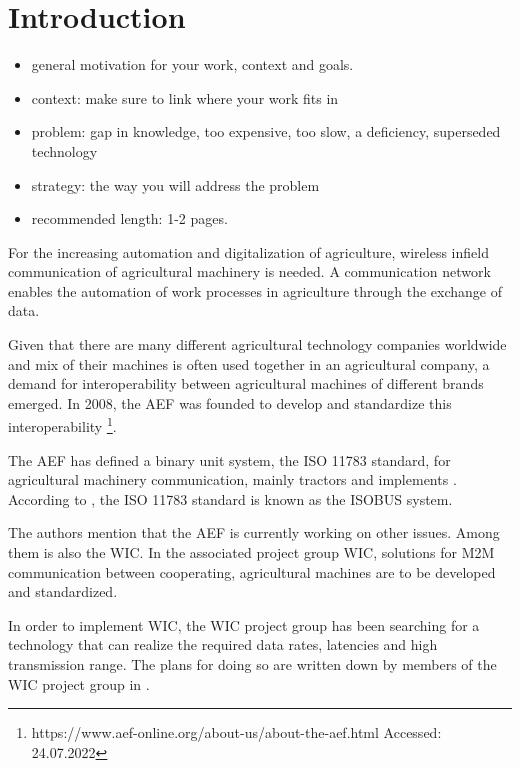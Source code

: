 \documentclass[]{nsm-thesis}
\begin{document}
\cleardoublepage
{}


\chapter{Introduction}
\label{sec:introduction}

\begin{itemize}
\item general motivation for your work, context and goals.
\item context: make sure to link where your work fits in
\item problem: gap in knowledge, too expensive, too slow, a deficiency, superseded technology
\item strategy: the way you will address the problem
\item recommended length: 1-2 pages.
\end{itemize}
For the increasing automation and digitalization of agriculture, wireless infield communication of agricultural machinery is needed.
A communication network enables the automation of work processes in agriculture through the exchange of data.

Given that there are many different agricultural technology companies worldwide and  mix of their machines is often used
together in an agricultural company, a demand for interoperability between agricultural machines of different brands emerged.
In 2008, the \ac{AEF} was founded to develop and standardize this interoperability
\footnote{https://www.aef-online.org/about-us/about-the-aef.html Accessed: 24.07.2022}.

The AEF has defined a binary unit system, the ISO 11783 standard, for agricultural machinery communication, mainly tractors and
implements \cite{iglesias_enabling_2014}. According to \textcite{schlingmann_aef_2019}, the ISO 11783 standard is known as
the ISOBUS system.

The authors mention that the AEF is currently working on other issues. Among them is also the \ac{WIC}.
In the associated project group \ac{WIC}, solutions for \ac{M2M} communication between cooperating, agricultural machines are
to be developed and standardized.

In order to implement \ac{WIC}, the \ac{WIC} project group has been searching for a technology
that can realize the required data rates, latencies and high transmission range. The plans for doing so are written down by members of the \ac{WIC} project group in \cite{schlingmann_challenges_2017}.
\end{document}
